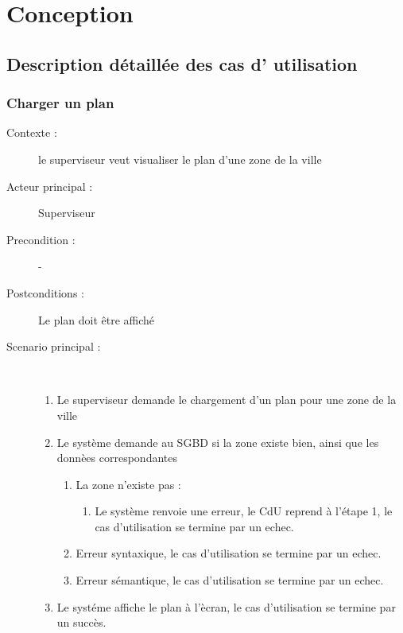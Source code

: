 \chapter{Conception}



\section{Description d\'etaill\'ee des cas d’ utilisation}

\subsection{Charger un plan}
\begin{description}
    \item[Contexte :] le superviseur veut visualiser le plan d'une zone de la ville
    \item[Acteur principal :] Superviseur
    \item[Precondition :] -
    \item[Postconditions :] Le plan doit \^etre affich\'e
    \item[Scenario principal :] ~
    \begin{enumerate}
        \item Le superviseur demande le chargement d'un plan pour une zone de la ville
        \item Le syst\`eme demande au SGBD si la zone existe bien, ainsi que les donn\`ees correspondantes
        \begin{enumerate}
            \item La zone n'existe pas :
            \begin{enumerate}
                \item Le syst\`eme renvoie une erreur, le CdU reprend \`a l'\'etape 1, le cas d'utilisation se termine par un echec.
            \end{enumerate}
            \item Erreur syntaxique, le cas d'utilisation se termine par un echec.
            \item Erreur s\'emantique, le cas d'utilisation se termine par un echec.
        \end{enumerate}
        \item Le syst\'eme affiche le plan \`a l'\`ecran, le cas d'utilisation se termine par un succ\`es.
    \end{enumerate}
\end{description}
\pagebreak

